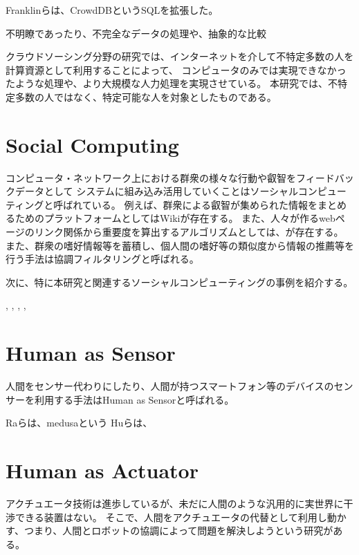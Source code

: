 Franklinらは、CrowdDBというSQLを拡張した。

不明瞭であったり、不完全なデータの処理や、抽象的な比較 \cite{crowddb}

\cite{cylog} \cite{crowdforge} \cite{community-based-crowdsourcing}

クラウドソーシング分野の研究では、インターネットを介して不特定多数の人を計算資源として利用することによって、
コンピュータのみでは実現できなかったような処理や、より大規模な人力処理を実現させている。
本研究では、不特定多数の人ではなく、特定可能な人を対象としたものである。

\section{Social Computing}\label{social-computing}

コンピュータ・ネットワーク上における群衆の様々な行動や叡智をフィードバックデータとして
システムに組み込み活用していくことはソーシャルコンピューティングと呼ばれている。
例えば、群衆による叡智が集められた情報をまとめるためのプラットフォームとしてはWiki\cite{wiki}が存在する。
また、人々が作るwebページのリンク関係から重要度を算出するアルゴリズムとしては、\cite{pagerank}が存在する。
また、群衆の嗜好情報等を蓄積し、個人間の嗜好等の類似度から情報の推薦等を行う手法は協調フィルタリングと呼ばれる\cite{collaborative-filtering}。

次に、特に本研究と関連するソーシャルコンピューティングの事例を紹介する。

\cite{dog}, \cite{jabberwocky}, \cite{social-machines},
\cite{personal-api},

\section{Human as Sensor}\label{human-as-sensor}

人間をセンサー代わりにしたり、人間が持つスマートフォン等のデバイスのセンサーを利用する手法はHuman
as Sensorと呼ばれる。

\cite{prism} \cite{moboq} Raらは、medusa\cite{Ra-medusa}という
Huらは、\cite{Hu:mobilecrowdsensing}

\section{Human as Actuator}\label{human-as-actuator}

アクチュエータ技術は進歩しているが、未だに人間のような汎用的に実世界に干渉できる装置はない。
そこで、人間をアクチュエータの代替として利用し動かす、つまり、人間とロボットの協調によって問題を解決しようという研究がある。

